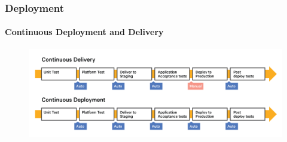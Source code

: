 \documentclass{beamer}
\begin{document}

\begin{frame}
	\frametitle{Deployment}
	\framesubtitle{Continuous Deployment and Delivery}
	\begin{figure}
		\begin{center}
			\includegraphics[scale=0.5]{delivery}
		\end{center}
	\end{figure}
\end{frame}
\end{document}
